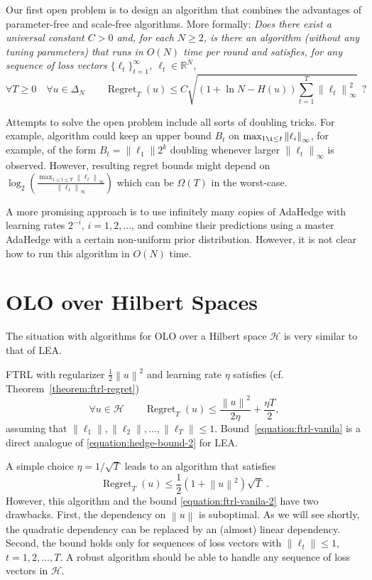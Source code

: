 \documentclass{colt2016} %
\DeclareMathOperator{\Regret}{Regret}
\newcommand{\R}{\mathbb{R}}     %
\renewcommand{\H}{\mathcal{H}}  %
\newcommand{\norm}[1]{\left\|{#1}\right\|}
\begin{document}
Our first open problem is to design an algorithm that combines the advantages
of parameter-free and scale-free algorithms. More formally: \emph{Does there
exist a universal constant $C > 0$ and, for each $N \ge 2$, is there an
algorithm (without any tuning parameters) that runs in $O(N)$ time per round
and satisfies, for any sequence of loss
vectors $\{\ell_t\}_{t=1}^\infty$, $\ell_t \in \R^N$,}
$$
\forall T \ge 0 \quad \forall u \in \Delta_N \qquad \Regret_T(u) \le C \sqrt{(1 + \ln N - H(u)) \sum_{t=1}^T \norm{\ell_t}_\infty^2} \ \ ?
$$

Attempts to solve the open problem include all sorts of doubling tricks.
For example, algorithm could keep an upper bound $B_t$ on $\max_{1 \i \le t}
\norm{\ell_i}_\infty$, for example, of the form $B_t = \norm{\ell_1} 2^k$
doubling whenever larger $\norm{\ell_t}_\infty$ is observed. However, resulting
regret bounds might depend on $\log_2 \left( \frac{\max_{1 \le t \le T}
\norm{\ell_t}_\infty}{\norm{\ell_1}_\infty} \right)$ which can be $\Omega(T)$
in the worst-case.

A more promising approach is to use infinitely many copies of AdaHedge with
learning rates $2^{-i}$, $i=1,2,\dots$, and combine their predictions using
a master AdaHedge with a certain non-uniform prior distribution. However, it is not clear how to run this
algorithm in $O(N)$ time.

\section{OLO over Hilbert Spaces}

The situation with algorithms for OLO over a Hilbert space $\H$ is very similar
to that of LEA.

FTRL with regularizer
$\frac{1}{2}\norm{u}^2$ and learning rate $\eta$ satisfies (cf. Theorem~\ref{theorem:ftrl-regret})
\begin{equation}
\label{equation:ftrl-vanila}
\forall u \in \H \qquad \Regret_T(u) \le \frac{\norm{u}^2}{2\eta} + \frac{\eta T}{2},
\end{equation}
assuming that $\norm{\ell_1}, \norm{\ell_2}, \dots, \norm{\ell_T} \le 1$.
Bound~\eqref{equation:ftrl-vanila} is a direct analogue of
\eqref{equation:hedge-bound-2} for LEA.

A simple choice $\eta = 1/\sqrt{T}$ leads to an algorithm that satisfies
\begin{equation}
\label{equation:ftrl-vanila-2}
\Regret_T(u) \le \frac{1}{2}\left(1+\norm{u}^2\right)\sqrt{T} \; .
\end{equation}
However, this algorithm and the bound \eqref{equation:ftrl-vanila-2} have two
drawbacks.  First, the dependency on $\norm{u}$ is suboptimal. As we will see
shortly, the quadratic dependency can be replaced by an (almost) linear
dependency.  Second, the bound holds only for sequences of loss vectors with
$\norm{\ell_t} \le 1$, $t=1,2,\dots,T$. A robust algorithm should be able to
handle any sequence of loss vectors in $\H$.
\end{document}
